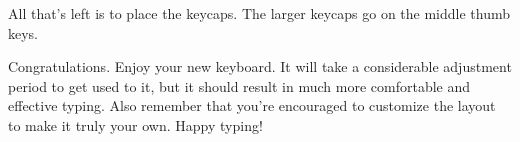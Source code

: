 \documentclass{article}
\begin{document}
\vspace{1em}

All that's left is to place the keycaps. The larger keycaps go on the
middle thumb keys.

\vspace{1em}

Congratulations. Enjoy your new keyboard. It will take a considerable
adjustment period to get used to it, but it should result in much more
comfortable and effective typing. Also remember that you're encouraged
to customize the layout to make it truly your own. Happy typing!

\end{document}
